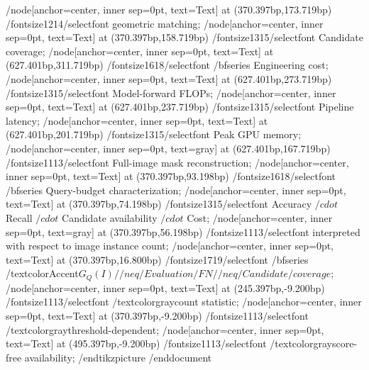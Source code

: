 /node[anchor=center, inner sep=0pt, text=Text] at (370.397bp,173.719bp) {/fontsize{12}{14}/selectfont  geometric matching};
/node[anchor=center, inner sep=0pt, text=Text] at (370.397bp,158.719bp) {/fontsize{13}{15}/selectfont  Candidate coverage};
/node[anchor=center, inner sep=0pt, text=Text] at (627.401bp,311.719bp) {/fontsize{16}{18}/selectfont /bfseries Engineering cost};
/node[anchor=center, inner sep=0pt, text=Text] at (627.401bp,273.719bp) {/fontsize{13}{15}/selectfont  Model-forward FLOPs};
/node[anchor=center, inner sep=0pt, text=Text] at (627.401bp,237.719bp) {/fontsize{13}{15}/selectfont  Pipeline latency};
/node[anchor=center, inner sep=0pt, text=Text] at (627.401bp,201.719bp) {/fontsize{13}{15}/selectfont  Peak GPU memory};
/node[anchor=center, inner sep=0pt, text=gray] at (627.401bp,167.719bp) {/fontsize{11}{13}/selectfont  Full-image mask reconstruction};
/node[anchor=center, inner sep=0pt, text=Text] at (370.397bp,93.198bp) {/fontsize{16}{18}/selectfont /bfseries Query-budget characterization};
/node[anchor=center, inner sep=0pt, text=Text] at (370.397bp,74.198bp) {/fontsize{13}{15}/selectfont  Accuracy $/cdot$ Recall $/cdot$ Candidate availability $/cdot$ Cost};
/node[anchor=center, inner sep=0pt, text=gray] at (370.397bp,56.198bp) {/fontsize{11}{13}/selectfont  interpreted with respect to image instance count};
/node[anchor=center, inner sep=0pt, text=Text] at (370.397bp,16.800bp) {/fontsize{17}{19}/selectfont /bfseries /textcolor{Accent}{$G_Q(I)/ /neq/ Evaluation/ FN/ /neq/ Candidate/ coverage$}};
/node[anchor=center, inner sep=0pt, text=Text] at (245.397bp,-9.200bp) {/fontsize{11}{13}/selectfont  /textcolor{gray}{count statistic}};
/node[anchor=center, inner sep=0pt, text=Text] at (370.397bp,-9.200bp) {/fontsize{11}{13}/selectfont  /textcolor{gray}{threshold-dependent}};
/node[anchor=center, inner sep=0pt, text=Text] at (495.397bp,-9.200bp) {/fontsize{11}{13}/selectfont  /textcolor{gray}{score-free availability}};
/end{tikzpicture}
/end{document}
